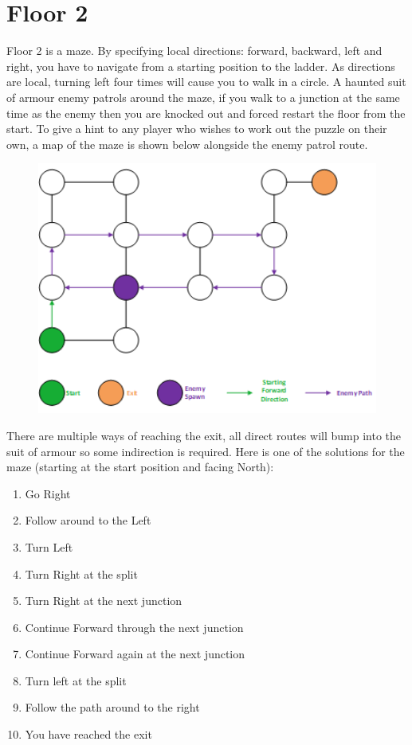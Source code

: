 \documentclass{article}
\begin{document}
\section*{Floor 2}
Floor 2 is a maze. By specifying local directions: forward, backward, left and right, you have to navigate from a starting position to the ladder.
As directions are local, turning left four times will cause you to walk in a circle.
A haunted suit of armour enemy patrols around the maze, if you walk to a junction at the same time as the enemy then you are knocked out and forced restart the floor from the start.
To give a hint to any player who wishes to work out the puzzle on their own, a map of the maze is shown below alongside the enemy patrol route.

\begin{figure}[htb]
	\centering
	\includegraphics[width=4.5in]{Floor2-Map.png}
\end{figure}

There are multiple ways of reaching the exit, all direct routes will bump into the suit of armour so some indirection is required. Here is one of the solutions for the maze (starting at the start position and facing North):

\begin{enumerate}
	\item Go Right
	\item Follow around to the Left
	\item Turn Left
	\item Turn Right at the split
	\item Turn Right at the next junction
	\item Continue Forward through the next junction
	\item Continue Forward again at the next junction
	\item Turn left at the split
	\item Follow the path around to the right
	\item You have reached the exit
\end{enumerate}
\end{document}

